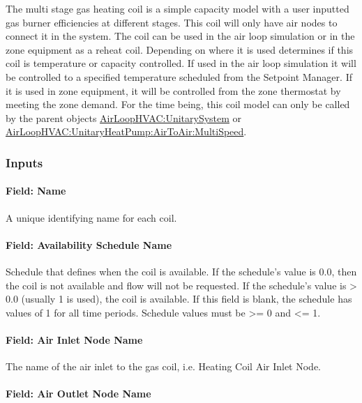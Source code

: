 The multi stage gas heating coil is a simple capacity model with a user inputted gas burner efficiencies at different stages. This coil will only have air nodes to connect it in the system. The coil can be used in the air loop simulation or in the zone equipment as a reheat coil. Depending on where it is used determines if this coil is temperature or capacity controlled. If used in the air loop simulation it will be controlled to a specified temperature scheduled from the Setpoint Manager. If it is used in zone equipment, it will be controlled from the zone thermostat by meeting the zone demand. For the time being, this coil model can only be called by the parent objects \hyperref[airloophvacunitarysystem]{AirLoopHVAC:UnitarySystem} or \hyperref[airloophvacunitaryheatpumpairtoairmultispeed]{AirLoopHVAC:UnitaryHeatPump:AirToAir:MultiSpeed}.

\subsubsection{Inputs}\label{inputs-11-005}

\paragraph{Field: Name}\label{field-name-10-005}

A unique identifying name for each coil.

\paragraph{Field: Availability Schedule Name}\label{field-availability-schedule-name-5-001}

Schedule that defines when the coil is available. If the schedule's value is 0.0, then the coil is not available and flow will not be requested. If the schedule's value is \textgreater{} 0.0 (usually 1 is used), the coil is available. If this field is blank, the schedule has values of 1 for all time periods. Schedule values must be \textgreater{}= 0 and \textless{}= 1.

\paragraph{Field: Air Inlet Node Name}\label{field-air-inlet-node-name-7}

The name of the air inlet to the gas coil, i.e. Heating Coil Air Inlet Node.

\paragraph{Field: Air Outlet Node Name}\label{field-air-outlet-node-name-7-000}


